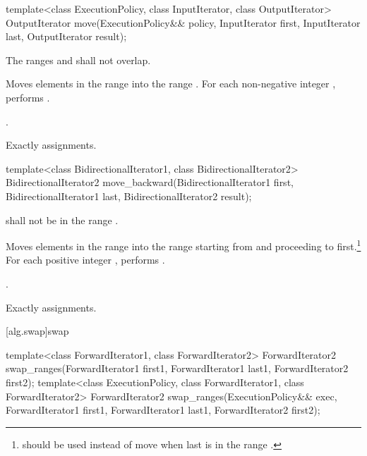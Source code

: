 %
\begin{itemdecl}
template<class ExecutionPolicy, class InputIterator, class OutputIterator>
  OutputIterator move(ExecutionPolicy&& policy, InputIterator first, InputIterator last,
                      OutputIterator result);
\end{itemdecl}

\begin{itemdescr}
\pnum
\requires The ranges  and
 shall not overlap.

\pnum
\effects Moves elements in the range  into
the range .
For each non-negative integer ,
performs .

\pnum
\returns {}.

\pnum
\complexity Exactly  assignments.
\end{itemdescr}

%
\begin{itemdecl}
template<class BidirectionalIterator1, class BidirectionalIterator2>
  BidirectionalIterator2
    move_backward(BidirectionalIterator1 first,
                  BidirectionalIterator1 last,
                  BidirectionalIterator2 result);
\end{itemdecl}


\begin{itemdescr}
\pnum
\requires
{}
shall not be in the range
.

\pnum
\effects
Moves elements in the range 
into the
range 
starting from
and proceeding to first.\footnote{
should be used instead of move when last
is in
the range
.}
For each positive integer
,
performs
.

\pnum
\returns
{}.

\pnum
\complexity
Exactly
assignments.
\end{itemdescr}

[alg.swap]{swap}

%
\begin{itemdecl}
template<class ForwardIterator1, class ForwardIterator2>
  ForwardIterator2
    swap_ranges(ForwardIterator1 first1, ForwardIterator1 last1,
                ForwardIterator2 first2);
template<class ExecutionPolicy, class ForwardIterator1, class ForwardIterator2>
  ForwardIterator2
    swap_ranges(ExecutionPolicy&& exec,
                ForwardIterator1 first1, ForwardIterator1 last1,
                ForwardIterator2 first2);
\end{itemdecl}


